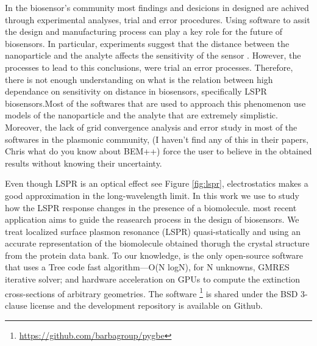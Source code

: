 In the biosensor's community most findings and desicions in designed are achived 
through experimental analyses, trial and error procedures. Using software to 
assit the design and manufacturing process can play a key role for the future
of biosensors. In particular, experiments suggest that the distance between the
nanoparticle and the analyte affects the sensitivity of the sensor
\cite{HaesETal2004}. However, the processes to lead to this conclusions, were 
trial an error processes. Therefore, there is not enough understanding on what 
is the relation between high dependance on sensitivity on distance in 
biosensors, specifically LSPR biosensors.Most of the softwares that are used to 
approach this phenomenon use models of 
the nanoparticle and the analyte that are extremely simplistic. Moreover, the 
lack of grid convergence analysis and error study in most of the softwares in 
the plasmonic community, {\color{red}(I haven't find any of this in 
their papers, Chris what do you know about BEM++)} force the user to believe 
in the obtained results without knowing their uncertainty.


Even though LSPR is an optical effect see Figure \ref{fig:lspr}, electrostatics 
makes a good approximation in the long-wavelength limit. In this work we use
\pygbe to study how the LSPR response changes in the presence
of a biomolecule. \pygbe most recent application \cite{ClementiETal2017} aims 
to guide the reasearch process in the design of biosensors. We treat localized 
surface plasmon resonance (LSPR) quasi-statically \cite{MayergoyzZhang2007} and
using an accurate representation of the biomolecule obtained thorugh the 
crystal structure from the protein data bank. To our knowledge, \pygbe is the 
only open-source software that uses a Tree code fast algorithm—O(N logN), for 
N unknowns, GMRES iterative solver; and hardware acceleration on GPUs to compute
the extinction cross-sections of arbitrary geometries. The software
\footnote{\url{https://github.com/barbagroup/pygbe}} is shared under the 
BSD 3-clause license and the development repository is available on Github.

